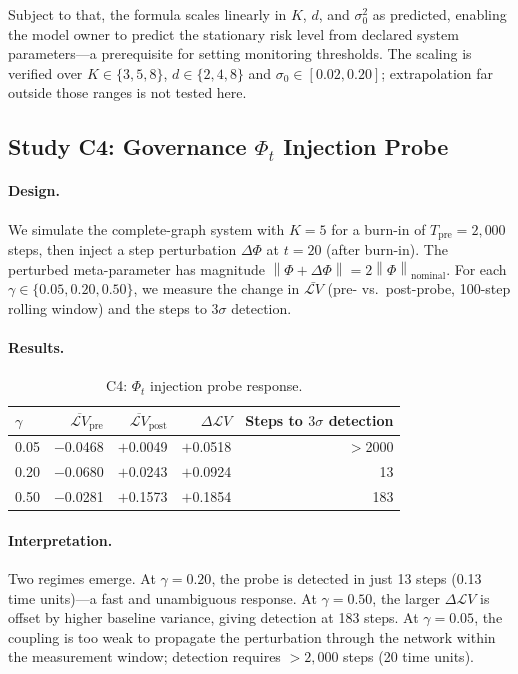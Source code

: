 \documentclass[12pt]{article}
\theoremstyle{plain}
\theoremstyle{definition}
\newcommand{\Lgen}{\mathcal{L}}
\newcommand{\norm}[1]{\left\lVert #1 \right\rVert}
\begin{document}
Subject to that, the formula scales linearly in $K$, $d$, and $\sigma_0^2$ as predicted, enabling
the model owner to predict the stationary risk level from declared system parameters---a
prerequisite for setting monitoring thresholds. The scaling is verified over $K\in\{3,5,8\}$,
$d\in\{2,4,8\}$ and $\sigma_0\in[0.02,0.20]$; extrapolation far outside those ranges is not
tested here.

\subsection{Study C4: Governance $\Phi_t$ Injection Probe}

\paragraph{Design.}
We simulate the complete-graph system with $K=5$ for a burn-in of
$T_{\mathrm{pre}} = 2{,}000$ steps, then inject a step perturbation
$\Delta\Phi$ at $t = 20$ (after burn-in).  The perturbed meta-parameter
has magnitude $\norm{\Phi + \Delta\Phi} = 2\norm{\Phi}_{\mathrm{nominal}}$.
For each $\gamma \in \{0.05, 0.20, 0.50\}$, we measure the change
in $\bar{\Lgen V}$ (pre- vs.\ post-probe, 100-step rolling window)
and the steps to $3\sigma$ detection.

\paragraph{Results.}

\begin{table}[H]
\centering
\caption{C4: $\Phi_t$ injection probe response.}
\label{tab:c4}
\begin{tabular}{lrrrr}
\toprule
$\gamma$ & $\overline{\Lgen V}_{\mathrm{pre}}$ &
$\overline{\Lgen V}_{\mathrm{post}}$ &
$\Delta\Lgen V$ & Steps to $3\sigma$ detection \\
\midrule
0.05 & $-$0.0468 & $+$0.0049 & $+$0.0518 & $>$2000 \\
0.20 & $-$0.0680 & $+$0.0243 & $+$0.0924 & 13 \\
0.50 & $-$0.0281 & $+$0.1573 & $+$0.1854 & 183 \\
\bottomrule
\end{tabular}
\end{table}

\paragraph{Interpretation.}
Two regimes emerge.  At $\gamma = 0.20$, the probe is detected in
just 13 steps (0.13 time units)---a fast and unambiguous response.
At $\gamma = 0.50$, the larger $\Delta\Lgen V$ is offset by higher
baseline variance, giving detection at 183 steps.  At $\gamma = 0.05$,
the coupling is too weak to propagate the perturbation through the
network within the measurement window; detection requires
$> 2{,}000$ steps (20 time units).
\end{document}
